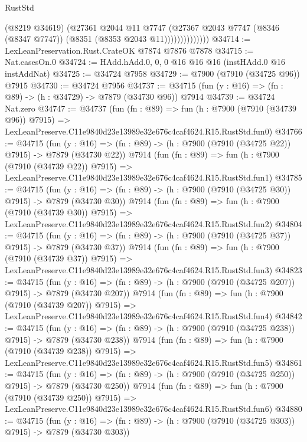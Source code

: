 \begin{lexlean}{RustStd}
\begin{coremodule}
                        (@8219 @34619)
                        (@27361
                          @2044
                          @11
                          @7747
                          (@27367
                            @2043
                            @7747
                            (@8346 (@8347 @7747))
                            (@8351 (@8353 @2043 @11))))))))))))))
@34714 := LexLeanPreservation.Rust.CrateOK @7874 @7876 @7878
@34715 := Nat.casesOn.{0}
@34724 := HAdd.hAdd.{0, 0, 0} @16 @16 @16 (instHAdd.{0} @16 instAddNat)
@34725 := @34724 @7958
@34729 := @7900 (@7910 (@34725 @96)) @7915
@34730 := @34724 @7956
@34737 := @34715 (fun (y : @16) => (fn : @89) -> (h : @34729) -> @7879 (@34730 @96)) @7914
@34739 := @34724 Nat.zero
@34747 := @34737
    (fun (fn : @89) =>
    fun (h : @7900 (@7910 (@34739 @96)) @7915) =>
    LexLeanPreserve.C11e9840d23e13989e32e676c4caf4624.R15.RustStd.fun0)
@34766 := @34715
    (fun (y : @16) => (fn : @89) -> (h : @7900 (@7910 (@34725 @22)) @7915) -> @7879 (@34730 @22))
    @7914
    (fun (fn : @89) =>
    fun (h : @7900 (@7910 (@34739 @22)) @7915) =>
    LexLeanPreserve.C11e9840d23e13989e32e676c4caf4624.R15.RustStd.fun1)
@34785 := @34715
    (fun (y : @16) => (fn : @89) -> (h : @7900 (@7910 (@34725 @30)) @7915) -> @7879 (@34730 @30))
    @7914
    (fun (fn : @89) =>
    fun (h : @7900 (@7910 (@34739 @30)) @7915) =>
    LexLeanPreserve.C11e9840d23e13989e32e676c4caf4624.R15.RustStd.fun2)
@34804 := @34715
    (fun (y : @16) => (fn : @89) -> (h : @7900 (@7910 (@34725 @37)) @7915) -> @7879 (@34730 @37))
    @7914
    (fun (fn : @89) =>
    fun (h : @7900 (@7910 (@34739 @37)) @7915) =>
    LexLeanPreserve.C11e9840d23e13989e32e676c4caf4624.R15.RustStd.fun3)
@34823 := @34715
    (fun (y : @16) => (fn : @89) -> (h : @7900 (@7910 (@34725 @207)) @7915) -> @7879 (@34730 @207))
    @7914
    (fun (fn : @89) =>
    fun (h : @7900 (@7910 (@34739 @207)) @7915) =>
    LexLeanPreserve.C11e9840d23e13989e32e676c4caf4624.R15.RustStd.fun4)
@34842 := @34715
    (fun (y : @16) => (fn : @89) -> (h : @7900 (@7910 (@34725 @238)) @7915) -> @7879 (@34730 @238))
    @7914
    (fun (fn : @89) =>
    fun (h : @7900 (@7910 (@34739 @238)) @7915) =>
    LexLeanPreserve.C11e9840d23e13989e32e676c4caf4624.R15.RustStd.fun5)
@34861 := @34715
    (fun (y : @16) => (fn : @89) -> (h : @7900 (@7910 (@34725 @250)) @7915) -> @7879 (@34730 @250))
    @7914
    (fun (fn : @89) =>
    fun (h : @7900 (@7910 (@34739 @250)) @7915) =>
    LexLeanPreserve.C11e9840d23e13989e32e676c4caf4624.R15.RustStd.fun6)
@34880 := @34715
    (fun (y : @16) => (fn : @89) -> (h : @7900 (@7910 (@34725 @303)) @7915) -> @7879 (@34730 @303))

\end{coremodule}
\end{lexlean}
